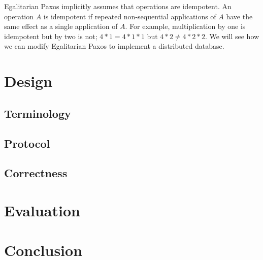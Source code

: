 \documentclass[../main.tex]{subfiles}
\begin{document}
  Egalitarian Paxos implicitly assumes that operations are idempotent. An operation $A$ is
  idempotent if repeated non-sequential applications of $A$ have the same effect as a single
  application of $A$. For example, multiplication by one is idempotent but by two is not;
  $4 * 1 = 4 * 1 * 1$ but $4 * 2 \ne 4 * 2 * 2$. We will see how we can modify Egalitarian Paxos to
  implement a distributed database.

\section{Design}

  \subsection{Terminology}

  \subsection{Protocol}

  \subsection{Correctness}

\section{Evaluation}

\section{Conclusion}
\end{document}
